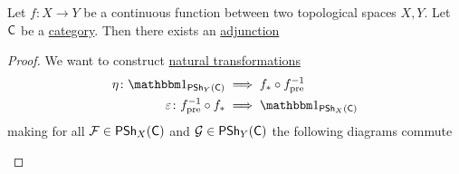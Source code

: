 \documentclass[../../main]{subfiles}
\begin{document}
\begin{theorem}\label{thm:direct-inverse-image-adjunction-presheaf}
  Let \(f\colon X \to Y\) be a continuous function between two topological spaces \(X, Y\).
  Let \(\mathsf{C}\) be a \hyperref[def:category]{category}.
  Then there exists an \hyperref[def:adjoint-functors]{adjunction}
  \begin{center}
  \end{center}
\end{theorem}
\begin{proof}
  We want to construct \hyperref[def:natural-transformation]{natural transformations}
  \begin{align*}
    \eta\colon \id_{\PSh_{Y}(\category{C})} &\implies f_{\ast} \circ f_{\operatorname{pre}}^{-1} \\
    \varepsilon\colon f_{\operatorname{pre}}^{-1} \circ f_{\ast} &\implies \id_{\PSh_{X}(\category{C})}
  \end{align*}
  making for all \(\mathcal{F} \in \mathsf{PSh}_{X}(\mathsf{C})\) and \(\mathcal{G} \in \mathsf{PSh}_{Y}(\mathsf{C})\) the following diagrams commute
  \begin{center}
  \end{center}


\end{proof}
\end{document}
